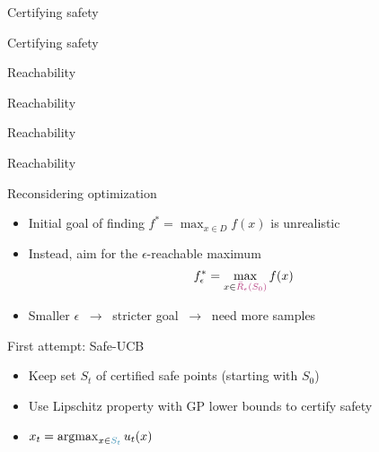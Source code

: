 \documentclass[xetex,10pt,mathserif]{beamer}
\newlength\figureheight
\newlength\figurewidth
\newcommand{\Rbeps}{\bar{R}_{\epsilon}}
\newcommand{\localucb}{{\sc\textsf{Safe-UCB}}\xspace}
\newcommand{\cst}{{\color{cyan!70!black}$S_t$}\xspace}
\newcommand{\ccst}{{\color{cyan!70!black}S_t}\xspace}
\newcommand{\ccrbeps}{{\color{magenta!70!black}\Rbeps(S_0)}\xspace}
\begin{document}
\begin{frame}{Certifying safety}
\centering
\setlength\figurewidth{5in}
\setlength\figureheight{3.5in}

\end{frame}

\begin{frame}{Certifying safety}
\centering
\setlength\figurewidth{5in}
\setlength\figureheight{3.5in}

\end{frame}

\begin{frame}{Reachability}
\centering
\setlength\figurewidth{5in}
\setlength\figureheight{3.5in}

\end{frame}

\begin{frame}{Reachability}
\centering
\setlength\figurewidth{5in}
\setlength\figureheight{3.5in}

\end{frame}

\begin{frame}{Reachability}
\centering
\setlength\figurewidth{5in}
\setlength\figureheight{3.5in}

\end{frame}

\begin{frame}{Reachability}
\centering
\setlength\figurewidth{5in}
\setlength\figureheight{3.5in}

\end{frame}

\begin{frame}{Reconsidering optimization}
\begin{itemize}
\item<1-> Initial goal of finding $f^* = \max_{x \in D}f(x)$ is unrealistic
\vspace{2em}
\item<2-> Instead, aim for the $\epsilon$-reachable maximum
\begin{align*}
  f_{\epsilon}^* = \max_{x \in \ccrbeps}f(x)
\end{align*}
\item<3-> Smaller $\epsilon$ $\ \rightarrow\ $ stricter goal $\ \rightarrow\ $ need more samples
\end{itemize}
\end{frame}

\begin{frame}{First attempt: \localucb}
\begin{itemize}
  \item<1-> Keep set \cst of certified safe points (starting with $S_0$)
  \vspace{2em}
  \item<2-> Use Lipschitz property with GP lower bounds to certify safety
  \vspace{2em}
  \item<3-> $x_t = \argmax_{x \in \ccst}u_t(x)$
\end{itemize}
\end{frame}
\end{document}
